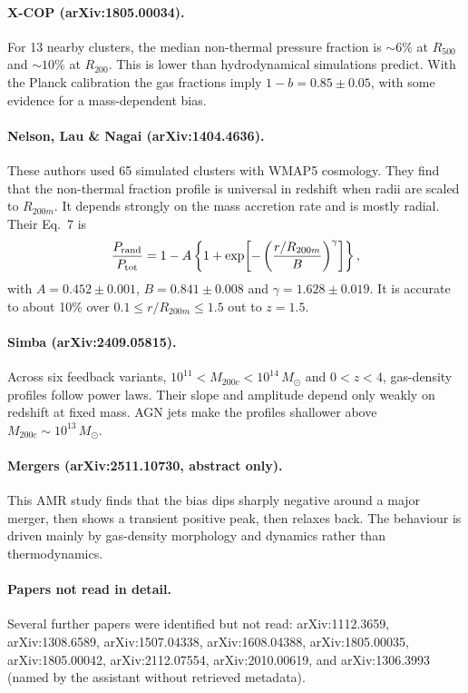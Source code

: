 \documentclass[11pt,a4paper]{article}
\begin{document}
\paragraph{X-COP (arXiv:1805.00034).}
For 13 nearby clusters, the median non-thermal pressure fraction is $\sim6\%$ at $R_{500}$ and $\sim10\%$ at $R_{200}$. This is lower than hydrodynamical simulations predict. With the Planck calibration the gas fractions imply $1-b=0.85\pm0.05$, with some evidence for a mass-dependent bias.

\paragraph{Nelson, Lau \& Nagai (arXiv:1404.4636).}
These authors used 65 simulated clusters with WMAP5 cosmology. They find that the non-thermal fraction profile is universal in redshift when radii are scaled to $R_{200m}$. It depends strongly on the mass accretion rate and is mostly radial. Their Eq.~7 is
\begin{equation}
\frac{P_{\rm rand}}{P_{\rm tot}} = 1 - A\left\{1+\exp\!\left[-\left(\frac{r/R_{200m}}{B}\right)^{\gamma}\right]\right\},
\end{equation}
with $A=0.452\pm0.001$, $B=0.841\pm0.008$ and $\gamma=1.628\pm0.019$. It is accurate to about 10\% over $0.1\le r/R_{200m}\le1.5$ out to $z=1.5$.

\paragraph{Simba (arXiv:2409.05815).}
Across six feedback variants, $10^{11}<M_{200c}<10^{14}\,M_\odot$ and $0<z<4$, gas-density profiles follow power laws. Their slope and amplitude depend only weakly on redshift at fixed mass. AGN jets make the profiles shallower above $M_{200c}\sim10^{13}\,M_\odot$.

\paragraph{Mergers (arXiv:2511.10730, abstract only).}
This AMR study finds that the bias dips sharply negative around a major merger, then shows a transient positive peak, then relaxes back. The behaviour is driven mainly by gas-density morphology and dynamics rather than thermodynamics.

\paragraph{Papers not read in detail.}
Several further papers were identified but not read: arXiv:1112.3659, arXiv:1308.6589, arXiv:1507.04338, arXiv:1608.04388, arXiv:1805.00035, arXiv:1805.00042, arXiv:2112.07554, arXiv:2010.00619, and arXiv:1306.3993 (named by the assistant without retrieved metadata).
\end{document}
